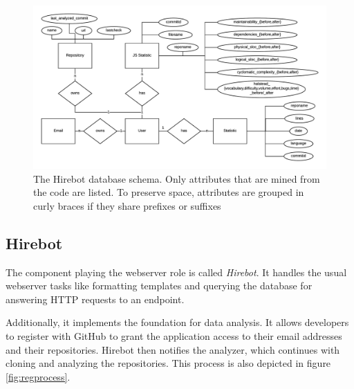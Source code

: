 \begin{figure}
  \centering
  \includegraphics[width=35em]{gfx/schema.png}
  \caption{The Hirebot database schema. Only attributes that are mined from the code are listed. To preserve space, attributes are grouped in curly braces if they share prefixes or suffixes}
  \label{fig:schema}
\end{figure}

\subsection{Hirebot}
The component playing the webserver role is called \textit{Hirebot}. It handles the usual webserver tasks like formatting templates and querying the database for answering HTTP requests to an endpoint.
\newline

Additionally, it implements the foundation for data analysis. It allows developers to register with GitHub to grant the application access to their email addresses and their repositories. Hirebot then notifies the analyzer, which continues with cloning and analyzing the repositories. This process is also depicted in figure \ref{fig:regprocess}.

